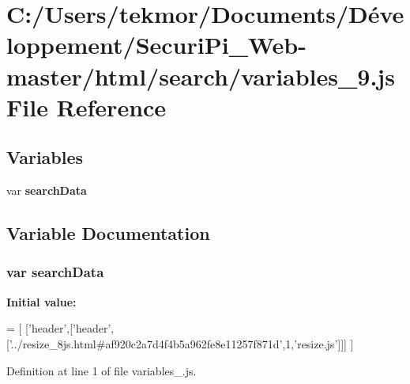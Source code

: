 \section{C\+:/\+Users/tekmor/\+Documents/\+Développement/\+Securi\+Pi\+\_\+\+Web-\/master/html/search/variables\+\_\+9.js File Reference}
\label{variables__9_8js}
\subsection*{Variables}
\begin{DoxyCompactItemize}
\item 
var {\bf search\+Data}
\end{DoxyCompactItemize}


\subsection{Variable Documentation}
\subsubsection[{search\+Data}]{\setlength{\rightskip}{0pt plus 5cm}var search\+Data}\label{variables__9_8js_ad01a7523f103d6242ef9b0451861231e}
{\bfseries Initial value\+:}
\begin{DoxyCode}
=
[
  [\textcolor{stringliteral}{'header'},[\textcolor{stringliteral}{'header'},[\textcolor{stringliteral}{'../resize\_8js.html#af920c2a7d4f4b5a962fe8e11257f871d'},1,\textcolor{stringliteral}{'resize.js'}]]]
]
\end{DoxyCode}


Definition at line 1 of file variables\+\_.\+js.

